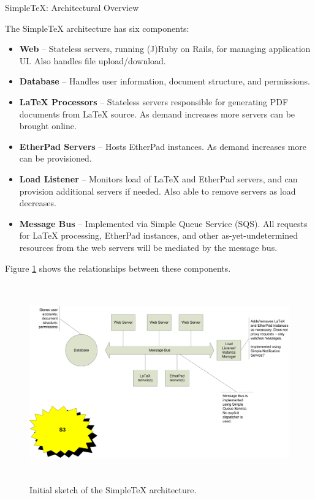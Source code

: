 \documentclass[11pt]{article}
\newcommand\STex{Simple\TeX\xspace}
\newcommand\LTex{\LaTeX\xspace}
\begin{document}
\thispagestyle{first}
\begin{center}
\Huge{\STex: Architectural Overview}
\end{center}

The \STex architecture has six components:

\begin{itemize}
\item \textbf{Web} -- Stateless servers, running (J)Ruby on Rails, for
  managing application UI. Also handles file upload/download.
\item \textbf{Database} -- Handles user information, document
  structure, and permissions.
\item \textbf{\LTex Processors} -- Stateless servers responsible for
  generating PDF documents from \LTex source. As demand increases more
  servers can be brought online.
\item \textbf{EtherPad Servers} -- Hosts EtherPad instances. As demand
  increases more can be provisioned.
\item \textbf{Load Listener} -- Monitors load of \LTex and EtherPad
  servers, and can provision additional servers if needed. Also able
  to remove servers as load decreases.
\item \textbf{Message Bus} -- Implemented via Simple Queue Service
  (SQS). All requests for \LTex processing, EtherPad instances, and
  other as-yet-undetermined resources from the web servers will be
  mediated by the message bus.
\end{itemize}

Figure \ref{fig_arch} shows the relationships between these
components.

\begin{figure}[h]
\centering
\includegraphics[width=6in,height=3.3738in]{SimpleTexArchitectureDiagram}
\caption{Initial sketch of the \STex architecture.}
\label{fig_arch}
\end{figure}
\end{document}
